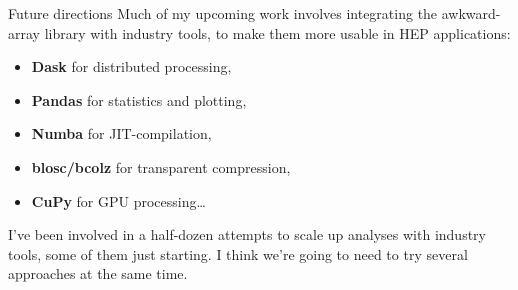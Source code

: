 \documentclass[aspectratio=169]{beamer}
\begin{document}
\begin{frame}{Future directions}
\large
\vspace{0.5 cm}
Much of my upcoming work involves integrating the awkward-array library with industry tools, to make them more usable in HEP applications:

\begin{center}
\begin{minipage}{0.7\linewidth}
\begin{itemize}
\item {\bf Dask} for distributed processing,
\item {\bf Pandas} for statistics and plotting,
\item {\bf Numba} for JIT-compilation,
\item {\bf blosc/bcolz} for transparent compression,
\item {\bf CuPy} for GPU processing\ldots
\end{itemize}
\end{minipage}
\end{center}

\vspace{0.5 cm}
I've been involved in a half-dozen attempts to scale up analyses with industry tools, some of them just starting. I think we're going to need to try several approaches at the same time.
\end{frame}
\end{document}
